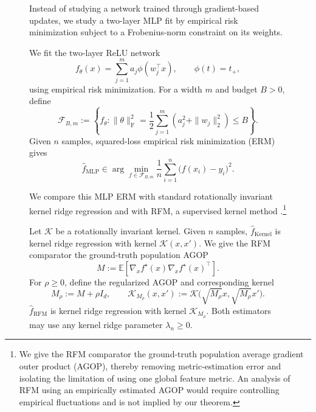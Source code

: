 \documentclass{article}
\newcounter{setting}[section]
\newcounter{trainingsetup}
\begin{document}
\begin{figure}
Instead of studying a network trained through gradient-based
updates, we study a two-layer MLP fit by empirical risk minimization subject
to a Frobenius-norm constraint on its weights.

\begingroup
{}

\begin{trainingsetup}
\label{train:mlp-gap}
We fit the two-layer ReLU network
\[
    f_\theta(x)=\sum_{j=1}^m a_j\phi(w_j^\top x),
    \qquad
    \phi(t)=t_+,
\]
using empirical risk minimization. For a width $m$ and budget $B>0$, define
\[
    \mathcal F_{B,m}
    :=
    \left\{
        f_\theta:
        \|\theta\|_{\mathrm F}^2
        =\frac12\sum_{j=1}^m
        \left(a_j^2+\|w_j\|_2^2\right)
        \leq B
    \right\}.
\]
Given $n$ samples, squared-loss empirical risk minimization (ERM) gives
\[
    \widehat f_{\mathrm{MLP}}
    \in
    \arg\min_{f\in\mathcal F_{B,m}}
    \frac1n\sum_{i=1}^n\bigl(f(x_i)-y_i\bigr)^2.
\]
\end{trainingsetup}

\endgroup

We compare this MLP ERM with standard rotationally invariant kernel ridge
regression and with RFM, a supervised kernel method
\citep{radhakrishnan2024mechanism,radhakrishnan2025linear}.\footnote{
We give the RFM comparator the ground-truth population average gradient outer
product (AGOP), thereby removing metric-estimation error and isolating the
limitation of using one global feature metric. An analysis of RFM using an
empirically estimated AGOP would require controlling empirical fluctuations
and is not implied by our theorem.}

\begingroup
{}


\begin{trainingsetup}
\label{train:rfm-gap}

Let $\mathcal K$ be a rotationally invariant kernel. Given $n$ samples,
$\widehat f_{\mathrm{Kernel}}$ is kernel ridge regression with kernel
$\mathcal K(x,x')$. We give the RFM comparator the ground-truth population
AGOP\footnotemark
\[
    M
    :=\mathbb E\left[
        \nabla_x f^\star(x)\nabla_x f^\star(x)^\top
      \right].
\]
For $\rho\geq0$, define the regularized AGOP and corresponding kernel
\[
    M_\rho:=M+\rho I_d,
    \qquad
    \mathcal K_{M_\rho}(x,x')
    :=\mathcal K\bigl(\sqrt{M_\rho}x,\sqrt{M_\rho}x'\bigr).
\]
$\widehat f_{\mathrm{RFM}}$ is kernel ridge regression with kernel
$\mathcal K_{M_\rho}$. Both estimators may use any kernel ridge parameter
$\lambda_n\geq0$.


\end{trainingsetup}
\end{figure}
\end{document}
